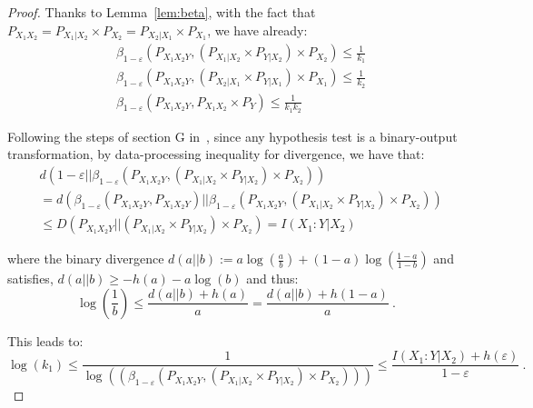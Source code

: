   \begin{proof}
    Thanks to Lemma~\ref{lem:beta}, with the fact that $P_{X_1X_2} = P_{X_1|X_2} \times P_{X_2} = P_{X_2|X_1} \times P_{X_1}$, we have already:
    \begin{equation}
      \begin{aligned}
        &\beta_{1-\varepsilon}\left(P_{X_1X_2Y},\left(P_{X_1|X_2} \times P_{Y|X_2} \right) \times P_{X_2}\right) \leq \frac{1}{k_1}\\
        &\beta_{1-\varepsilon}\left(P_{X_1X_2Y},\left(P_{X_2|X_1} \times P_{Y|X_1} \right) \times P_{X_1}\right) \leq \frac{1}{k_2}\\
        &\beta_{1-\varepsilon}\left(P_{X_1X_2Y},P_{X_1X_2} \times P_{Y}\right) \leq \frac{1}{k_1k_2}       
      \end{aligned}
    \end{equation}

    Following the steps of section G in~\cite{PPV10}, since any hypothesis test is a binary-output transformation, by data-processing inequality for divergence, we have that:
    \begin{equation}
      \begin{aligned}
        &d\left(1-\varepsilon||\beta_{1-\varepsilon}\left(P_{X_1X_2Y},\left(P_{X_1|X_2} \times P_{Y|X_2} \right) \times P_{X_2}\right)\right)\\
        &= d\left(\beta_{1-\varepsilon}\left(P_{X_1X_2Y},P_{X_1X_2Y}\right)||\beta_{1-\varepsilon}\left(P_{X_1X_2Y},\left(P_{X_1|X_2} \times P_{Y|X_2} \right) \times P_{X_2}\right)\right)\\
        &\leq D\left(P_{X_1X_2Y}||\left(P_{X_1|X_2} \times P_{Y|X_2} \right) \times P_{X_2}\right) = I(X_1:Y|X_2)
      \end{aligned}
    \end{equation}
      

    where the binary divergence $d(a||b):= a\log\left(\frac{a}{b}\right) + (1-a)\log\left(\frac{1-a}{1-b}\right)$ and satisfies, $d(a||b) \geq -h(a) - a\log(b)$ and thus:
    \[ \log(\frac{1}{b}) \leq \frac{d(a||b) + h(a)}{a} = \frac{d(a||b) + h(1-a)}{a} \ . \]

    This leads to:
    \[\log(k_1) \leq \frac{1}{\log\left(\left(\beta_{1-\varepsilon}\left(P_{X_1X_2Y},\left(P_{X_1|X_2} \times P_{Y|X_2} \right) \times P_{X_2}\right)\right)\right)} \leq \frac{I(X_1:Y|X_2) + h(\varepsilon)}{1-\varepsilon} \ .\]


\end{proof}
